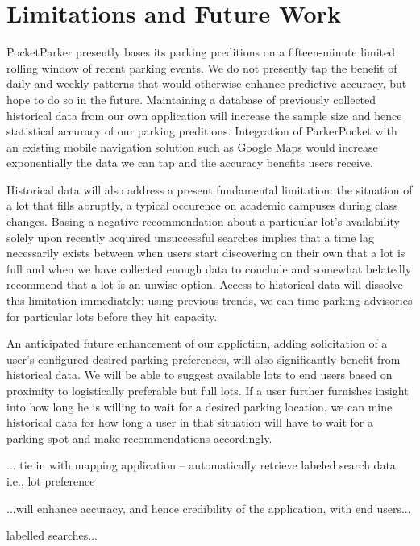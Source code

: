 \section{Limitations and Future Work}
\label{sec-future}



PocketParker presently bases its parking preditions on a fifteen-minute 
limited rolling window of recent parking events. We do not presently tap the
benefit of daily and weekly patterns that would otherwise enhance predictive
accuracy, but hope to do so in the future. Maintaining a database of
previously collected historical data from our own application will increase
the sample size and hence statistical accuracy of our parking preditions.
Integration of ParkerPocket with an existing mobile navigation solution such
as Google Maps would increase exponentially the data we can tap and the
accuracy benefits users receive.

Historical data will also address a present fundamental limitation:  the
situation of a lot that fills abruptly, a typical occurence on academic
campuses during class changes. Basing a negative recommendation about a
particular lot's availability solely upon recently acquired unsuccessful
searches implies that a time lag necessarily exists between when users start
discovering on their own that a lot is full and when we have collected enough
data to conclude and somewhat belatedly recommend that a lot is an unwise
option. Access to historical data will dissolve this limitation immediately:
using previous trends, we can time parking advisories for particular lots
before they hit capacity.

An anticipated future enhancement of our appliction, adding solicitation of
a user's configured desired parking preferences, will also significantly
benefit from historical data. We will be able to suggest available lots to
end users based on proximity to logistically preferable but full lots. If a
user further furnishes insight into how long he is willing to wait for a
desired parking location, we can mine historical data for how long a user
in that situation will have to wait for a parking spot and make
recommendations accordingly.

... tie in with mapping application -- automatically retrieve labeled search
data i.e., lot preference


...will enhance accuracy, and hence credibility of the application, with end users...




labelled searches...







